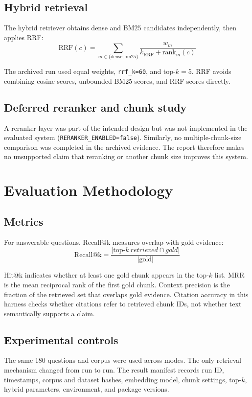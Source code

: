 \documentclass[11pt]{article}
\begin{document}
\subsection{Hybrid retrieval}

The hybrid retriever obtains dense and BM25 candidates independently, then applies RRF:
\[
\mathrm{RRF}(c)=
\sum_{m\in\{\mathrm{dense},\mathrm{bm25}\}}
\frac{w_m}{k_{\mathrm{RRF}}+\mathrm{rank}_m(c)}
\]

The archived run used equal weights, \texttt{rrf\_k=60}, and top-$k=5$. RRF avoids combining cosine scores, unbounded BM25 scores, and RRF scores directly.

\subsection{Deferred reranker and chunk study}

A reranker layer was part of the intended design but was not implemented in the evaluated system (\texttt{RERANKER\_ENABLED=false}). Similarly, no multiple-chunk-size comparison was completed in the archived evidence. The report therefore makes no unsupported claim that reranking or another chunk size improves this system.

\section{Evaluation Methodology}

\subsection{Metrics}

For answerable questions, Recall@k measures overlap with gold evidence:
\[
\mathrm{Recall@k}
=\frac{|\mathrm{top}\text{-}k\ retrieved \cap gold|}
{|\mathrm{gold}|}
\]

Hit@k indicates whether at least one gold chunk appears in the top-$k$ list. MRR is the mean reciprocal rank of the first gold chunk. Context precision is the fraction of the retrieved set that overlaps gold evidence. Citation accuracy in this harness checks whether citations refer to retrieved chunk IDs, not whether text semantically supports a claim.

\subsection{Experimental controls}

The same 180 questions and corpus were used across modes. The only retrieval mechanism changed from run to run. The result manifest records run ID, timestamps, corpus and dataset hashes, embedding model, chunk settings, top-$k$, hybrid parameters, environment, and package versions.
\end{document}
